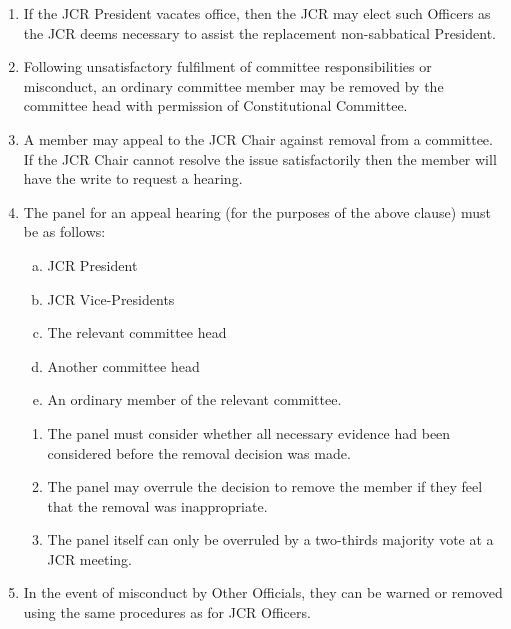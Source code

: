 \documentclass[12pt]{article}  %
\begin{document}
\begin{enumerate}
	\item If the JCR President vacates office, then the JCR may elect such Officers as the JCR deems necessary to assist the replacement non-sabbatical President.
	\item Following unsatisfactory fulfilment of committee responsibilities or misconduct, an ordinary committee member may be removed by the committee head with permission of Constitutional Committee.
	\item A member may appeal to the JCR Chair against removal from a committee. If the JCR Chair cannot resolve the issue satisfactorily then the member will have the write to request a hearing.
	\item The panel for an appeal hearing (for the purposes of the above clause) must be as follows:
	\begin{enumerate}[(a)]
		\item JCR President
		\item JCR Vice-Presidents
		\item The relevant committee head
		\item Another committee head
		\item An ordinary member of the relevant committee.
	\end{enumerate}
	\begin{enumerate}
		\item The panel must consider whether all necessary evidence had been considered before the removal decision was made.
		\item The panel may overrule the decision to remove the member if they feel that the removal was inappropriate.
		\item The panel itself can only be overruled by a two-thirds majority vote at a JCR meeting.
	\end{enumerate}
	\item In the event of misconduct by Other Officials, they can be warned or removed using the same procedures as for JCR Officers.
\end{enumerate}
\newpage
\end{document}
